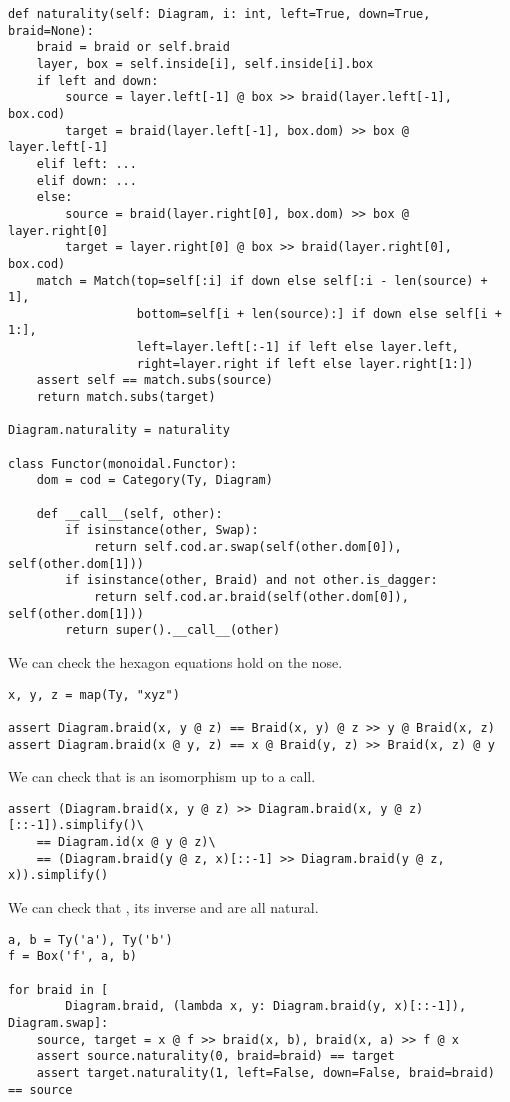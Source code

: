 \begin{python}
\begin{verbatim}
def naturality(self: Diagram, i: int, left=True, down=True, braid=None):
    braid = braid or self.braid
    layer, box = self.inside[i], self.inside[i].box
    if left and down:
        source = layer.left[-1] @ box >> braid(layer.left[-1], box.cod)
        target = braid(layer.left[-1], box.dom) >> box @ layer.left[-1]
    elif left: ...
    elif down: ...
    else:
        source = braid(layer.right[0], box.dom) >> box @ layer.right[0]
        target = layer.right[0] @ box >> braid(layer.right[0], box.cod)
    match = Match(top=self[:i] if down else self[:i - len(source) + 1],
                  bottom=self[i + len(source):] if down else self[i + 1:],
                  left=layer.left[:-1] if left else layer.left,
                  right=layer.right if left else layer.right[1:])
    assert self == match.subs(source)
    return match.subs(target)

Diagram.naturality = naturality

class Functor(monoidal.Functor):
    dom = cod = Category(Ty, Diagram)

    def __call__(self, other):
        if isinstance(other, Swap):
            return self.cod.ar.swap(self(other.dom[0]), self(other.dom[1]))
        if isinstance(other, Braid) and not other.is_dagger:
            return self.cod.ar.braid(self(other.dom[0]), self(other.dom[1]))
        return super().__call__(other)
\end{verbatim}
\end{python}

\begin{example}
We can check the hexagon equations hold on the nose.

\begin{verbatim}
x, y, z = map(Ty, "xyz")

assert Diagram.braid(x, y @ z) == Braid(x, y) @ z >> y @ Braid(x, z)
assert Diagram.braid(x @ y, z) == x @ Braid(y, z) >> Braid(x, z) @ y
\end{verbatim}

We can check that  is an isomorphism up to a  call.

\begin{verbatim}
assert (Diagram.braid(x, y @ z) >> Diagram.braid(x, y @ z)[::-1]).simplify()\
    == Diagram.id(x @ y @ z)\
    == (Diagram.braid(y @ z, x)[::-1] >> Diagram.braid(y @ z, x)).simplify()
\end{verbatim}

We can check that , its inverse and  are all natural.

\begin{verbatim}
a, b = Ty('a'), Ty('b')
f = Box('f', a, b)

for braid in [
        Diagram.braid, (lambda x, y: Diagram.braid(y, x)[::-1]), Diagram.swap]:
    source, target = x @ f >> braid(x, b), braid(x, a) >> f @ x
    assert source.naturality(0, braid=braid) == target
    assert target.naturality(1, left=False, down=False, braid=braid) == source
\end{verbatim}
\end{example}

